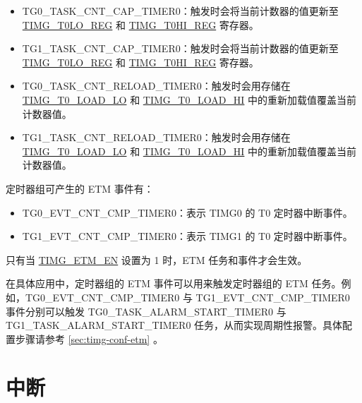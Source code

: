 \documentclass[main\_\_CN.tex]{subfiles}
\begin{document}
\begin{itemize}
\begin{tiplisting}
\begin{enumerate}
    \item TG0\_TASK\_ALARM\_START\_TIMER0 与 TG1\_TASK\_ALARM\_START\_TIMER0：触发时启用警报生成
    \item 警报事件：触发时关闭警报生成
    \item APB 方式配置 TIMG\_ALARM\_EN：启用/关闭警报生成
\end{enumerate}
\end{tiplisting}

\item TG0\_TASK\_CNT\_CAP\_TIMER0：触发时会将当前计数器的值更新至 \hyperref[regdesc:TIMGTXLOREG]{TIMG\_T0LO\_REG} 和 \hyperref[regdesc:TIMGTXHIREG]{TIMG\_T0HI\_REG} 寄存器。
\item TG1\_TASK\_CNT\_CAP\_TIMER0：触发时会将当前计数器的值更新至 \hyperref[regdesc:TIMGTXLOREG]{TIMG\_T0LO\_REG} 和 \hyperref[regdesc:TIMGTXHIREG]{TIMG\_T0HI\_REG} 寄存器。
\item TG0\_TASK\_CNT\_RELOAD\_TIMER0：触发时会用存储在 \hyperref[fielddesc:TIMGTXLOADLO]{TIMG\_T0\_LOAD\_LO} 和 \hyperref[fielddesc:TIMGTXLOADHI]{TIMG\_T0\_LOAD\_HI} 中的重新加载值覆盖当前计数器值。
\item TG1\_TASK\_CNT\_RELOAD\_TIMER0：触发时会用存储在 \hyperref[fielddesc:TIMGTXLOADLO]{TIMG\_T0\_LOAD\_LO} 和 \hyperref[fielddesc:TIMGTXLOADHI]{TIMG\_T0\_LOAD\_HI} 中的重新加载值覆盖当前计数器值。
\end{itemize}

定时器组可产生的 ETM 事件有：

\begin{itemize}
\item TG0\_EVT\_CNT\_CMP\_TIMER0：表示 TIMG0 的 T0 定时器中断事件。
\item TG1\_EVT\_CNT\_CMP\_TIMER0：表示 TIMG1 的 T0 定时器中断事件。
\end{itemize}

只有当 \hyperref[fielddesc:TIMGETMEN]{TIMG\_ETM\_EN} 设置为 1 时，ETM 任务和事件才会生效。

在具体应用中，定时器组的 ETM 事件可以用来触发定时器组的 ETM 任务。例如，TG0\_EVT\_CNT\_CMP\_TIMER0 与 TG1\_EVT\_CNT\_CMP\_TIMER0 事件分别可以触发 TG0\_TASK\_ALARM\_START\_TIMER0 与 TG1\_TASK\_ALARM\_START\_TIMER0 任务，从而实现周期性报警。具体配置步骤请参考 \ref{sec:timg-conf-etm} 。


\section{中断}
\label{sec:timg-interrupt}
\end{document}
